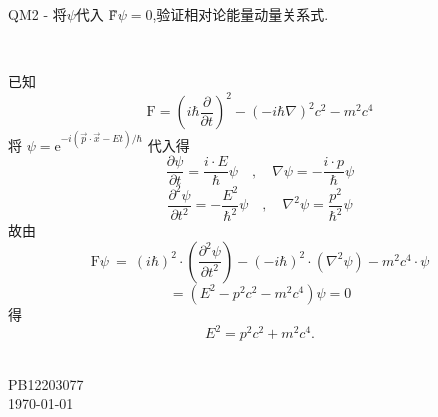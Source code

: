 \documentclass[a4paper,11pt]{article}
\begin{document}
    \begin{CJK*}{UTF8}{kai}
    QM2 - 将$\psi$代入 \~{F}$\psi = 0$,验证相对论能量动量关系式.
    \end{CJK*}\\[.5cm]
    \begin{CJK*}{UTF8}{song}
    已知
        $$\mbox{\~{F}} = (i\hbar \frac{\partial}{\partial t})^{2} - (-i\hbar \nabla)^{2}c^{2}-m^{2}c^{4}$$
    将
    $\psi = \mathrm{e}^{-i(\overrightarrow{p}\cdot\overrightarrow{x}-Et)/\hbar}$
    代入得
    $$\frac{\partial\psi}{\partial t} = \frac{i\cdot E}{\hbar}\psi \quad,
    \quad \nabla\psi = -\frac{i\cdot p}{\hbar}\psi$$
    $$\frac{\partial ^{2} \psi}{\partial t^{2}} = -\frac{E^{2}}{\hbar ^{2}}\psi \quad,
    \quad \nabla ^{2}\psi = \frac{p^{2}}{\hbar ^{2}}\psi$$
    故由
        $$\mbox{\~{F}}\psi\ =\ (i\hbar)^{2}\cdot (\frac{\partial ^{2} \psi}{\partial t^{2}})
        - (-i\hbar)^{2}\cdot (\nabla ^{2} \psi)
        -m^{2}c^{4}\cdot \psi$$
        $$=(E^{2}-p^{2}c^{2}-m^{2}c^{4})\psi = 0$$
    得
        $$E^{2}=p^{2}c^{2}+m^{2}c^{4}.$$\\
    \begin{CJK*}{UTF8}{kai}
        \begin{flushright}
            \small PB12203077\\
            \footnotesize \today
        \end{flushright}
    \end{CJK*}
    \end{CJK*}
\end{document}
